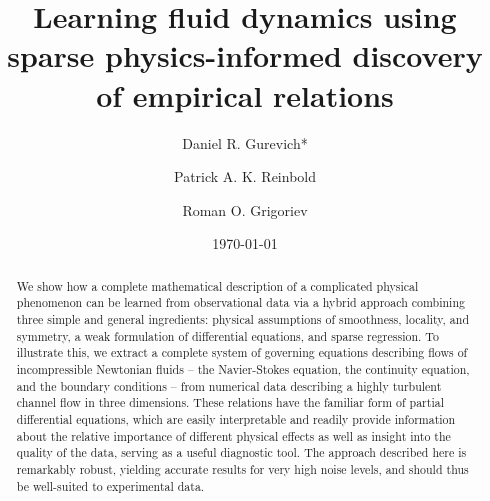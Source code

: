 \documentclass[
 reprint,
 amsmath,amssymb,
 aps,
]{revtex4-2}
\begin{document}
\title{Learning fluid dynamics using sparse physics-informed discovery of empirical relations}
\author{Daniel R. Gurevich*}
\author{Patrick A. K. Reinbold}
\author{Roman O. Grigoriev}
\date{\today}

\begin{abstract}
We show how a complete mathematical description of a complicated physical phenomenon can be learned from observational data via a hybrid approach combining three simple and general ingredients: physical assumptions of smoothness, locality, and symmetry, a weak formulation of differential equations, and sparse regression. To illustrate this, we extract a complete system of governing equations describing flows of incompressible Newtonian fluids -- the Navier-Stokes equation, the continuity equation, and the boundary conditions -- from numerical data describing a highly turbulent channel flow in three dimensions. These relations have the familiar form of partial differential equations, which are easily interpretable and readily provide information about the relative importance of different physical effects as well as insight into the quality of the data, serving as a useful diagnostic tool. The approach described here is remarkably robust, yielding accurate results for very high noise levels, and should thus be well-suited to experimental data.
\end{abstract}
\end{document}
